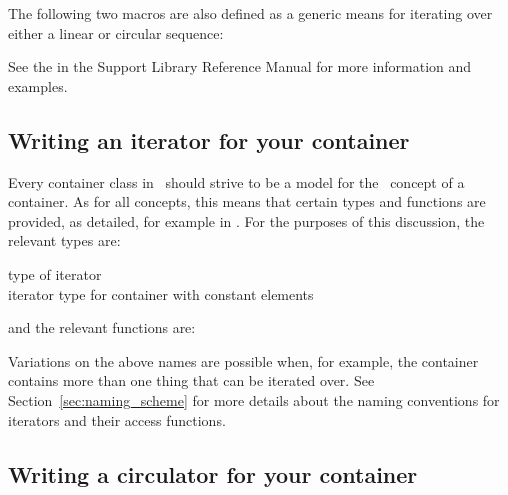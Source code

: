 The following two macros are also defined as a generic means for iterating
over either a linear or circular sequence:



See the  in the
Support Library Reference Manual for more information and examples.

\subsection{Writing an iterator for your container}
\label{sec:class_iterator}

Every container class in \cgal\ should strive to be a model for the
\stl\ concept of a container.  As for all concepts, this means that 
certain types and functions are provided, as detailed, for example 
in \cite{Austern98}.  For the purposes of this discussion, the relevant
types are:
\begin{tabbing}
 \> type of iterator \\
 \> iterator type for container with constant elements
\end{tabbing}

and the relevant functions are:

Variations on the above names are possible when, for example, the container
contains more than one thing that can be iterated over.  See 
Section~\ref{sec:naming_scheme} for more details about the naming conventions
for iterators and their access functions.

\subsection{Writing a circulator for your container}
\label{sec:class_circulator}

